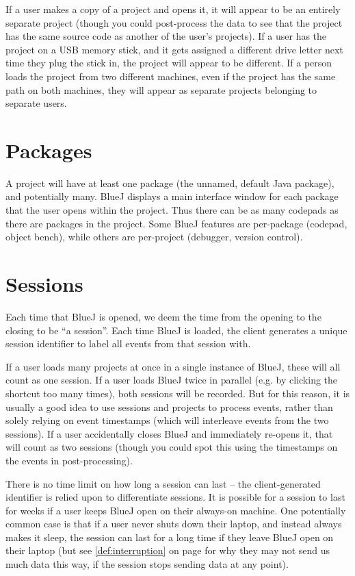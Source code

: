 \documentclass{report}
\newcommand{\myref}[1]{\autoref{#1} on page \pageref*{#1}}
\begin{document}
If a user makes a copy of a project and opens it, it will appear to be an
entirely separate project (though you could post-process the data to see that
the project has the same source code as another of the user's projects).  If a
user has the project on a USB memory stick, and it gets assigned a different
drive letter next time they plug the stick in, the project will appear to be
different.  If a person loads the project from two different machines, even if
the project has the same path on both machines, they will appear as separate
projects belonging to separate users.

\section{Packages}
\label{def:packages}

A project will have at least one package (the unnamed, default Java package),
and potentially many.  BlueJ displays a main interface window for each package
that the user opens within the project.  Thus there can be as many codepads as
there are packages in the project.  Some BlueJ features are per-package (codepad,
object bench), while others are per-project (debugger, version control).

\section{Sessions}
\label{def:sequence_id}

Each time that BlueJ is opened, we deem the time from the opening to the
closing to be ``a session''.  Each time BlueJ is loaded, the client generates
a unique session identifier to label all events from that session with.

If a user loads many projects at once in a single instance of BlueJ, these
will all count as one session.  If a user loads BlueJ twice in parallel
(e.g. by clicking the shortcut too many times), both sessions will be
recorded.  But for this reason, it is usually a good idea to use sessions and projects to
process events, rather than solely relying on event timestamps (which will
interleave events from the two sessions).  If a user accidentally closes BlueJ
and immediately re-opens it, that will count as two sessions (though you could
spot this using the timestamps on the events in post-processing).

There is no time limit on how long a session can last -- the client-generated
identifier is relied upon to differentiate sessions.  It is possible for a
session to last for weeks if a user keeps BlueJ open on their always-on
machine.  One potentially common case is that if a user never shuts down their
laptop, and instead always makes it sleep, the session can last for a long
time if they leave BlueJ open on their laptop (but see
\myref{def:interruption} for why they may not send us much data this way, if the session
stops sending data at any point).
\end{document}
